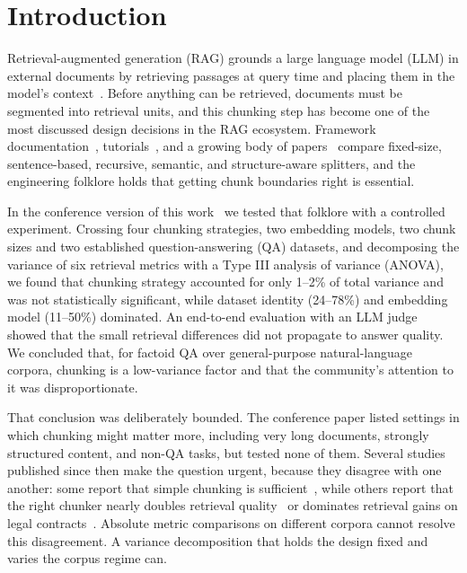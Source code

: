 \documentclass[runningheads]{llncs}
\begin{document}
\section{Introduction}
\label{sec:intro}

Retrieval-augmented generation (RAG) grounds a large language model (LLM) in external documents by retrieving passages at query time and placing them in the model's context~\cite{lewis2020rag,gao2023survey}. Before anything can be retrieved, documents must be segmented into retrieval units, and this chunking step has become one of the most discussed design decisions in the RAG ecosystem. Framework documentation~\cite{langchain2023,llamaindex2023}, tutorials~\cite{kamradt2023}, and a growing body of papers~\cite{jimenoyepes2024financial,qu2025semantic,duarte2024lumberchunker,zhao2024metachunking} compare fixed-size, sentence-based, recursive, semantic, and structure-aware splitters, and the engineering folklore holds that getting chunk boundaries right is essential.

In the conference version of this work~\cite{chauhan2026chunking} we tested that folklore with a controlled experiment. Crossing four chunking strategies, two embedding models, two chunk sizes and two established question-answering (QA) datasets, and decomposing the variance of six retrieval metrics with a Type III analysis of variance (ANOVA), we found that chunking strategy accounted for only 1--2\% of total variance and was not statistically significant, while dataset identity (24--78\%) and embedding model (11--50\%) dominated. An end-to-end evaluation with an LLM judge showed that the small retrieval differences did not propagate to answer quality. We concluded that, for factoid QA over general-purpose natural-language corpora, chunking is a low-variance factor and that the community's attention to it was disproportionate.

That conclusion was deliberately bounded. The conference paper listed settings in which chunking might matter more, including very long documents, strongly structured content, and non-QA tasks, but tested none of them. Several studies published since then make the question urgent, because they disagree with one another: some report that simple chunking is sufficient~\cite{bennani2026systematic,caspari2026complex,kreileder2026academic,li2025enhancing}, while others report that the right chunker nearly doubles retrieval quality~\cite{shaukat2026systematic} or dominates retrieval gains on legal contracts~\cite{singh2026strucchunk}. Absolute metric comparisons on different corpora cannot resolve this disagreement. A variance decomposition that holds the design fixed and varies the corpus regime can.
\end{document}
